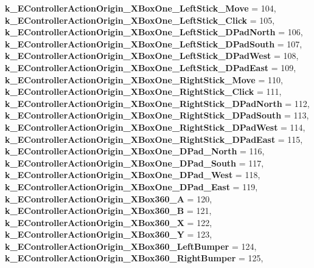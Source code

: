 \begin{DoxyCompactItemize}
\newline
{\bfseries k\+\_\+\+E\+Controller\+Action\+Origin\+\_\+\+X\+Box\+One\+\_\+\+Left\+Stick\+\_\+\+Move} = 104, 
{\bfseries k\+\_\+\+E\+Controller\+Action\+Origin\+\_\+\+X\+Box\+One\+\_\+\+Left\+Stick\+\_\+\+Click} = 105, 
{\bfseries k\+\_\+\+E\+Controller\+Action\+Origin\+\_\+\+X\+Box\+One\+\_\+\+Left\+Stick\+\_\+\+D\+Pad\+North} = 106, 
{\bfseries k\+\_\+\+E\+Controller\+Action\+Origin\+\_\+\+X\+Box\+One\+\_\+\+Left\+Stick\+\_\+\+D\+Pad\+South} = 107, 
\newline
{\bfseries k\+\_\+\+E\+Controller\+Action\+Origin\+\_\+\+X\+Box\+One\+\_\+\+Left\+Stick\+\_\+\+D\+Pad\+West} = 108, 
{\bfseries k\+\_\+\+E\+Controller\+Action\+Origin\+\_\+\+X\+Box\+One\+\_\+\+Left\+Stick\+\_\+\+D\+Pad\+East} = 109, 
{\bfseries k\+\_\+\+E\+Controller\+Action\+Origin\+\_\+\+X\+Box\+One\+\_\+\+Right\+Stick\+\_\+\+Move} = 110, 
{\bfseries k\+\_\+\+E\+Controller\+Action\+Origin\+\_\+\+X\+Box\+One\+\_\+\+Right\+Stick\+\_\+\+Click} = 111, 
\newline
{\bfseries k\+\_\+\+E\+Controller\+Action\+Origin\+\_\+\+X\+Box\+One\+\_\+\+Right\+Stick\+\_\+\+D\+Pad\+North} = 112, 
{\bfseries k\+\_\+\+E\+Controller\+Action\+Origin\+\_\+\+X\+Box\+One\+\_\+\+Right\+Stick\+\_\+\+D\+Pad\+South} = 113, 
{\bfseries k\+\_\+\+E\+Controller\+Action\+Origin\+\_\+\+X\+Box\+One\+\_\+\+Right\+Stick\+\_\+\+D\+Pad\+West} = 114, 
{\bfseries k\+\_\+\+E\+Controller\+Action\+Origin\+\_\+\+X\+Box\+One\+\_\+\+Right\+Stick\+\_\+\+D\+Pad\+East} = 115, 
\newline
{\bfseries k\+\_\+\+E\+Controller\+Action\+Origin\+\_\+\+X\+Box\+One\+\_\+\+D\+Pad\+\_\+\+North} = 116, 
{\bfseries k\+\_\+\+E\+Controller\+Action\+Origin\+\_\+\+X\+Box\+One\+\_\+\+D\+Pad\+\_\+\+South} = 117, 
{\bfseries k\+\_\+\+E\+Controller\+Action\+Origin\+\_\+\+X\+Box\+One\+\_\+\+D\+Pad\+\_\+\+West} = 118, 
{\bfseries k\+\_\+\+E\+Controller\+Action\+Origin\+\_\+\+X\+Box\+One\+\_\+\+D\+Pad\+\_\+\+East} = 119, 
\newline
{\bfseries k\+\_\+\+E\+Controller\+Action\+Origin\+\_\+\+X\+Box360\+\_\+A} = 120, 
{\bfseries k\+\_\+\+E\+Controller\+Action\+Origin\+\_\+\+X\+Box360\+\_\+B} = 121, 
{\bfseries k\+\_\+\+E\+Controller\+Action\+Origin\+\_\+\+X\+Box360\+\_\+X} = 122, 
{\bfseries k\+\_\+\+E\+Controller\+Action\+Origin\+\_\+\+X\+Box360\+\_\+Y} = 123, 
\newline
{\bfseries k\+\_\+\+E\+Controller\+Action\+Origin\+\_\+\+X\+Box360\+\_\+\+Left\+Bumper} = 124, 
{\bfseries k\+\_\+\+E\+Controller\+Action\+Origin\+\_\+\+X\+Box360\+\_\+\+Right\+Bumper} = 125, 

\end{DoxyCompactItemize}
